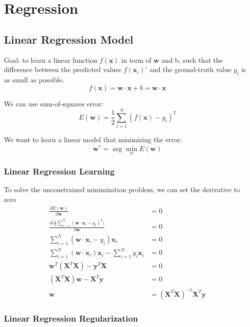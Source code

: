 \chapter{Regression}

\begin{multicols*}{2}
\section{Linear Regression Model}

\noindent Goal: to learn a linear function $f(\mathbf{x})$ in term of $\mathbf{w}$ and b, such that the difference between the predicted values $f(\mathbf{x}_i)'$ and the ground-truth value $y_i$ is as small as possible. 
$$f(\mathbf{x}) = \mathbf{w} \cdot \mathbf{x} + b = \mathbf{w} \cdot \mathbf{x}$$

\noindent We can use sum-of-squares error:
$$E(\mathbf{w}) = \frac{1}{2} \sum_{i=1}^N ( f(\mathbf{x}) - y_i )^2$$

\noindent We want to learn a linear model that minimizing the error:
$$\mathbf{w}^* = \arg\!\min_w E(\mathbf{w})$$

\subsection{Linear Regression Learning}
\noindent To solve the unconstrained minimization problem, we can set the derivative to zero
\begin{equation*}
\begin{split}
    \frac{\partial E(\mathbf{w})}{\partial \mathbf{w}} &= 0\\
    \frac{\partial \Big(\frac{1}{2} \sum_{i=1}^N (\mathbf{w} \cdot \mathbf{x}_i - y_i)^2\Big)}{\partial \mathbf{w}} &= 0 \\
    \sum_{i=1}^N (\mathbf{w} \cdot \mathbf{x}_i - y_i)\mathbf{x}_i &= 0 \\
    \sum_{i=1}^N (\mathbf{w} \cdot \mathbf{x}_i)\mathbf{x}_i - \sum_{i=1}^N y_i \mathbf{x}_i &= 0 \\
    \mathbf{w}^T(\mathbf{X}^T \mathbf{X}) - \mathbf{y}^T \mathbf{X} &= 0 \\
    (\mathbf{X}^T \mathbf{X}) \mathbf{w} - \mathbf{X}^T \mathbf{y} &= 0 \\
    \mathbf{w} &= (\mathbf{X}^T \mathbf{X})^{-1} \mathbf{X}^T \mathbf{y}
\end{split}
\end{equation*}

\subsection{Linear Regression Regularization}


\end{multicols*}
